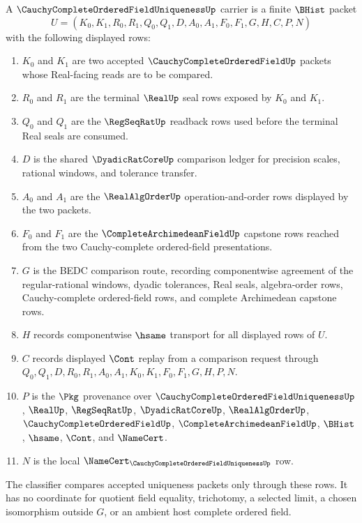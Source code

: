 \begin{definition}
\label{def:cauchy-complete-ordered-field-uniqueness-carrier}
A $\CauchyCompleteOrderedFieldUniquenessUp$ carrier is a finite $\BHist$ packet
$$
U=(K_0,K_1,R_0,R_1,Q_0,Q_1,D,A_0,A_1,F_0,F_1,G,H,C,P,N)
$$
with the following displayed rows:
\begin{enumerate}
\item $K_0$ and $K_1$ are two accepted $\CauchyCompleteOrderedFieldUp$ packets whose Real-facing reads are to be compared.
\item $R_0$ and $R_1$ are the terminal $\RealUp$ seal rows exposed by $K_0$ and $K_1$.
\item $Q_0$ and $Q_1$ are the $\RegSeqRatUp$ readback rows used before the terminal Real seals are consumed.
\item $D$ is the shared $\DyadicRatCoreUp$ comparison ledger for precision scales, rational windows, and tolerance transfer.
\item $A_0$ and $A_1$ are the $\RealAlgOrderUp$ operation-and-order rows displayed by the two packets.
\item $F_0$ and $F_1$ are the $\CompleteArchimedeanFieldUp$ capstone rows reached from the two Cauchy-complete ordered-field presentations.
\item $G$ is the BEDC comparison route, recording componentwise agreement of the regular-rational windows, dyadic tolerances, Real seals, algebra-order rows, Cauchy-complete ordered-field rows, and complete Archimedean capstone rows.
\item $H$ records componentwise $\hsame$ transport for all displayed rows of $U$.
\item $C$ records displayed $\Cont$ replay from a comparison request through $Q_0,Q_1,D,R_0,R_1,A_0,A_1,K_0,K_1,F_0,F_1,G,H,P,N$.
\item $P$ is the $\Pkg$ provenance over $\CauchyCompleteOrderedFieldUniquenessUp$, $\RealUp$, $\RegSeqRatUp$, $\DyadicRatCoreUp$, $\RealAlgOrderUp$, $\CauchyCompleteOrderedFieldUp$, $\CompleteArchimedeanFieldUp$, $\BHist$, $\hsame$, $\Cont$, and $\NameCert$.
\item $N$ is the local $\NameCert_{\CauchyCompleteOrderedFieldUniquenessUp}$ row.
\end{enumerate}
The classifier compares accepted uniqueness packets only through these rows. It has no coordinate for quotient field equality, trichotomy, a selected limit, a chosen isomorphism outside $G$, or an ambient host complete ordered field.
\end{definition}

